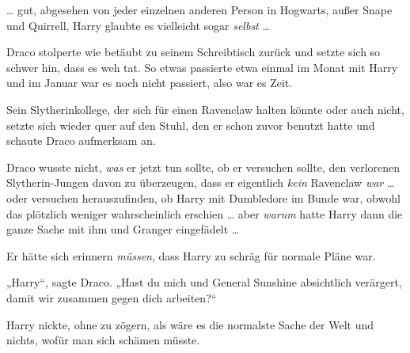 … gut, abgesehen von jeder einzelnen anderen Person in Hogwarts, außer Snape und Quirrell, Harry glaubte es vielleicht sogar \emph{selbst} …

Draco stolperte wie betäubt zu seinem Schreibtisch zurück und setzte sich so schwer hin, dass es weh tat. So etwas passierte etwa einmal im Monat mit Harry und im Januar war es noch nicht passiert, also war es Zeit.

Sein Slytherinkollege, der sich für einen Ravenclaw halten könnte oder auch nicht, setzte sich wieder quer auf den Stuhl, den er schon zuvor benutzt hatte und schaute Draco aufmerksam an.

Draco wusste nicht, \emph{was} er jetzt tun sollte, ob er versuchen sollte, den verlorenen Slytherin-Jungen davon zu überzeugen, dass er eigentlich \emph{kein} Ravenclaw \emph{war} … oder versuchen herauszufinden, ob Harry mit Dumbledore im Bunde war, obwohl das plötzlich weniger wahrscheinlich erschien … aber \emph{warum} hatte Harry dann die ganze Sache mit ihm und Granger eingefädelt …

Er hätte sich erinnern \emph{müssen}, dass Harry zu schräg für normale Pläne war.

„Harry“, sagte Draco.
„Hast du mich und General Sunshine absichtlich verärgert, damit wir zusammen gegen dich arbeiten?“

Harry nickte, ohne zu zögern, als wäre es die normalste Sache der Welt und nichts, wofür man sich schämen müsste.

